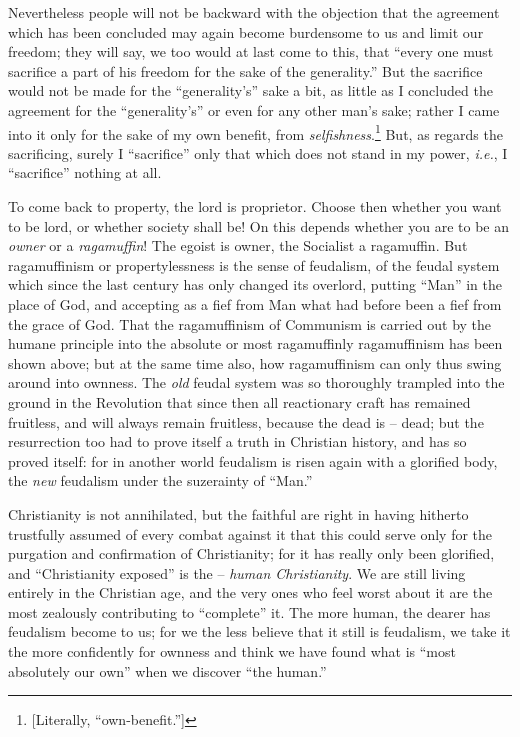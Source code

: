 \documentclass[12pt,a4paper]{book}
\begin{document}
Nevertheless people will not be backward with the objection that the agreement 
which has been concluded may again become burdensome to us and limit our 
freedom; they will say, we too would at last come to this, that ``every one 
must sacrifice a part of his freedom for the sake of the generality.'' But 
the sacrifice would not be made for the ``generality's'' sake a bit, as 
little as I concluded the agreement for the ``generality's'' or even for any 
other man's sake; rather I came into it only for the sake of my own benefit, 
from \textit{selfishness}.\footnote{[Literally, ``own-benefit.'']} But, as 
regards the sacrificing, surely I ``sacrifice'' only that which does not 
stand in my power, \textit{i.e.}, I ``sacrifice'' nothing at all.

To come back to property, the lord is proprietor. Choose then whether you want 
to be lord, or whether society shall be! On this depends whether you are to be 
an \textit{owner} or a \textit{ragamuffin}! The egoist is owner, the Socialist 
a ragamuffin. But ragamuffinism or propertylessness is the sense of feudalism, 
of the feudal system which since the last century has only changed its 
overlord, putting ``Man'' in the place of God, and accepting as a fief from 
Man what had before been a fief from the grace of God. That the ragamuffinism 
of Communism is carried out by the humane principle into the absolute or most 
ragamuffinly ragamuffinism has been shown above; but at the same time also, 
how ragamuffinism can only thus swing around into ownness. The \textit{old} 
feudal system was so thoroughly trampled into the ground in the Revolution 
that since then all reactionary craft has remained fruitless, and will always 
remain fruitless, because the dead is -- dead; but the resurrection too had to 
prove itself a truth in Christian history, and has so proved itself: for in 
another world feudalism is risen again with a glorified body, the \textit{new} 
feudalism under the suzerainty of ``Man.''

Christianity is not annihilated, but the faithful are right in having hitherto 
trustfully assumed of every combat against it that this could serve only for 
the purgation and confirmation of Christianity; for it has really only been 
glorified, and ``Christianity exposed'' is the -- \textit{human 
Christianity}. We are still living entirely in the Christian age, and the very 
ones who feel worst about it are the most zealously contributing to 
``complete'' it. The more human, the dearer has feudalism become to us; for 
we the less believe that it still is feudalism, we take it the more 
confidently for ownness and think we have found what is ``most absolutely our 
own'' when we discover ``the human.''
\end{document}
